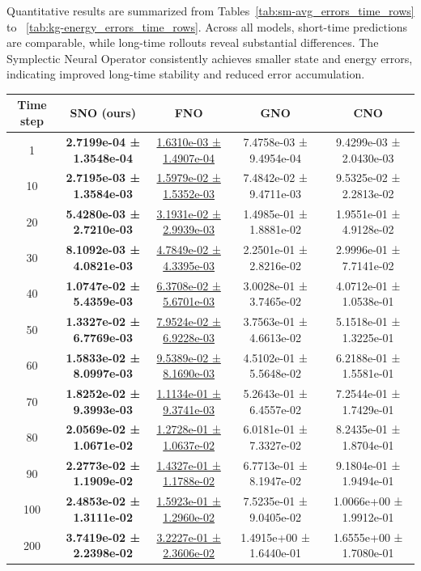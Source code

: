 \documentclass{article}
\theoremstyle{plain}
\theoremstyle{definition}
\theoremstyle{remark}
\begin{document}
Quantitative results are summarized from Tables~\ref{tab:sm-avg_errors_time_rows}
to ~\ref{tab:kg-energy_errors_time_rows}.
Across all models, short-time predictions are comparable, while long-time rollouts
reveal substantial differences.
The Symplectic Neural Operator consistently achieves smaller state and energy errors,
indicating improved long-time stability and reduced error accumulation.

\begin{table}[htbp]
\centering
\small
\setlength{\tabcolsep}{6pt}
\begin{tabular}{ccccc}
\hline
Time step & SNO (ours) & FNO & GNO & CNO \\
\hline
1   & \textbf{2.7199e-04 ± 1.3548e-04} & \underline{1.6310e-03 ± 1.4907e-04} & 7.4758e-03 ± 9.4954e-04 & 9.4299e-03 ± 2.0430e-03 \\
10  & \textbf{2.7195e-03 ± 1.3584e-03} & \underline{1.5979e-02 ± 1.5352e-03} & 7.4842e-02 ± 9.4711e-03 & 9.5325e-02 ± 2.2813e-02 \\
20  & \textbf{5.4280e-03 ± 2.7210e-03} & \underline{3.1931e-02 ± 2.9939e-03} & 1.4985e-01 ± 1.8881e-02 & 1.9551e-01 ± 4.9128e-02 \\
30  & \textbf{8.1092e-03 ± 4.0821e-03} & \underline{4.7849e-02 ± 4.3395e-03} & 2.2501e-01 ± 2.8216e-02 & 2.9996e-01 ± 7.7141e-02 \\
40  & \textbf{1.0747e-02 ± 5.4359e-03} & \underline{6.3708e-02 ± 5.6701e-03} & 3.0028e-01 ± 3.7465e-02 & 4.0712e-01 ± 1.0538e-01 \\
50  & \textbf{1.3327e-02 ± 6.7769e-03} & \underline{7.9524e-02 ± 6.9228e-03} & 3.7563e-01 ± 4.6613e-02 & 5.1518e-01 ± 1.3225e-01 \\
60  & \textbf{1.5833e-02 ± 8.0997e-03} & \underline{9.5389e-02 ± 8.1690e-03} & 4.5102e-01 ± 5.5648e-02 & 6.2188e-01 ± 1.5581e-01 \\
70  & \textbf{1.8252e-02 ± 9.3993e-03} & \underline{1.1134e-01 ± 9.3741e-03} & 5.2643e-01 ± 6.4557e-02 & 7.2544e-01 ± 1.7429e-01 \\
80  & \textbf{2.0569e-02 ± 1.0671e-02} & \underline{1.2728e-01 ± 1.0637e-02} & 6.0181e-01 ± 7.3327e-02 & 8.2435e-01 ± 1.8704e-01 \\
90  & \textbf{2.2773e-02 ± 1.1909e-02} & \underline{1.4327e-01 ± 1.1788e-02} & 6.7713e-01 ± 8.1947e-02 & 9.1804e-01 ± 1.9494e-01 \\
100 & \textbf{2.4853e-02 ± 1.3111e-02} & \underline{1.5923e-01 ± 1.2960e-02} & 7.5235e-01 ± 9.0405e-02 & 1.0066e+00 ± 1.9912e-01 \\
200 & \textbf{3.7419e-02 ± 2.2398e-02} & \underline{3.2227e-01 ± 2.3606e-02} & 1.4915e+00 ± 1.6440e-01 & 1.6555e+00 ± 1.7080e-01 \\

\end{tabular}
\end{table}
\end{document}
